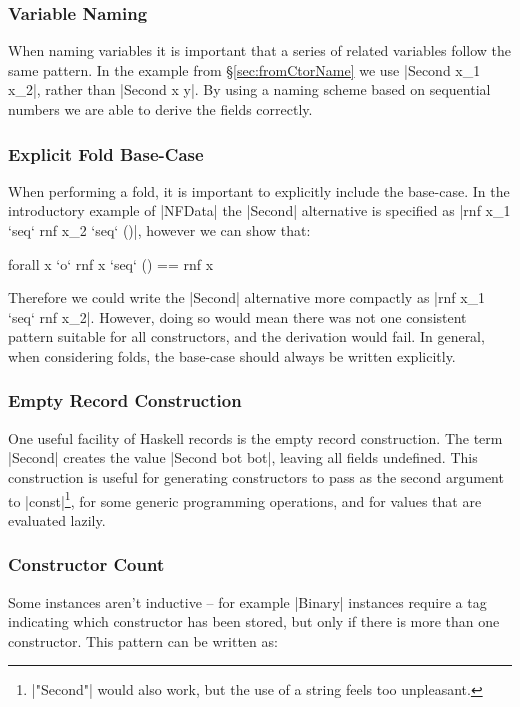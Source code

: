 \documentclass[preprint,draft]{sigplanconf}
\begin{document}
\subsubsection{Variable Naming}

When naming variables it is important that a series of related variables follow the same pattern. In the example from \S\ref{sec:fromCtorName} we use |Second x_1 x_2|, rather than |Second x y|. By using a naming scheme based on sequential numbers we are able to derive the fields correctly.

\subsubsection{Explicit Fold Base-Case}

When performing a fold, it is important to explicitly include the base-case. In the introductory example of |NFData| the |Second| alternative is specified as |rnf x_1 `seq` rnf x_2 `seq` ()|, however we can show that:

\ignore\begin{code}
forall x `o` rnf x `seq` () == rnf x
\end{code}

Therefore we could write the |Second| alternative more compactly as |rnf x_1 `seq` rnf x_2|. However, doing so would mean there was not one consistent pattern suitable for all constructors, and the derivation would fail. In general, when considering folds, the base-case should always be written explicitly.

\subsubsection{Empty Record Construction}

One useful facility of Haskell records is the empty record construction. The term |Second{}| creates the value |Second bot bot|, leaving all fields undefined. This construction is useful for generating constructors to pass as the second argument to |const|\footnote{|"Second"| would also work, but the use of a string feels too unpleasant.}, for some generic programming operations, and for values that are evaluated lazily.

\subsubsection{Constructor Count}

Some instances aren't inductive -- for example |Binary| instances require a tag indicating which constructor has been stored, but only if there is more than one constructor. This pattern can be written as:
\end{document}
